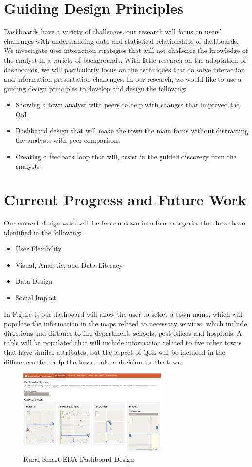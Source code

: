 \documentclass[10pt]{article}\usepackage[]{graphicx}\usepackage[]{color}
\begin{document}
\section{Guiding Design Principles}
Dashboards have a variety of challenges, our research will focus on users' challenges with understanding data and statistical relationships of dashboards. We investigate user interaction strategies that will not challenge the knowledge of the analyst in a variety of backgrounds. With little research on the adaptation of dashboards, we will particularly focus on the techniques that to solve interaction and information presentation challenges. In our research, we would like to use a guiding design principles to develop and design the following:
\begin{itemize}
\item Showing a town analyst with peers to help with changes that improved the QoL
\item Dashboard design that will make the town the main focus without distracting the analysts with peer comparisons
\item Creating a feedback loop that will, assist in the guided discovery from the analysts
\end{itemize}


\section{Current Progress and Future Work}
Our current design work will be broken down into four categories that have been identified in the following:
\begin{itemize}
\item User Flexibility 
\item Visual, Analytic, and Data Literacy
\item Data Design
\item Social Impact
\end{itemize}

In Figure 1, our dashboard will allow the user to select a town name, which will populate the  information in the maps related to necessary services, which include directions and distance to fire department, schools, post offices and hospitals. A table will be populated that will include information related to five other towns that have similar attributes, but the aspect of QoL will be included in the differences that help the town make a decision for the town. 

\begin{figure}[ht!]
\centering
\includegraphics[width=75mm]{SCC_Dashboard.png}
\caption{Rural Smart EDA Dashboard Design}
\end{figure}
\end{document}
